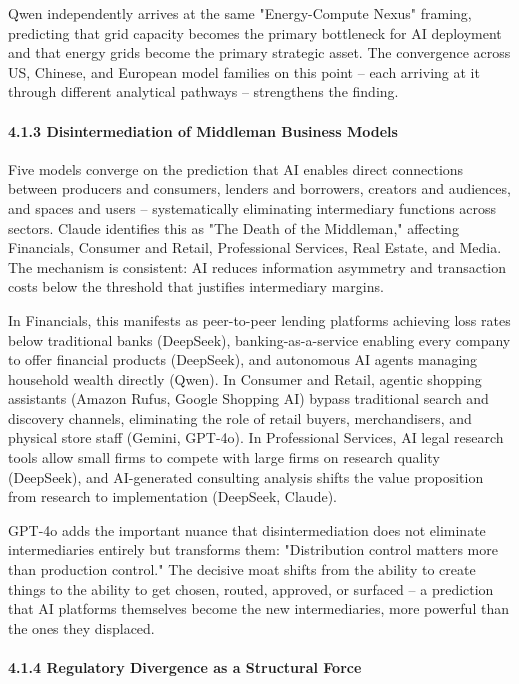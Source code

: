 \documentclass{article}
\begin{document}
Qwen independently arrives at the same "Energy-Compute Nexus" framing, predicting that grid capacity becomes the primary bottleneck for AI deployment and that energy grids become the primary strategic asset. The convergence across US, Chinese, and European model families on this point -- each arriving at it through different analytical pathways -- strengthens the finding.


\paragraph{4.1.3 Disintermediation of Middleman Business Models}

Five models converge on the prediction that AI enables direct connections between producers and consumers, lenders and borrowers, creators and audiences, and spaces and users -- systematically eliminating intermediary functions across sectors. Claude identifies this as "The Death of the Middleman," affecting Financials, Consumer and Retail, Professional Services, Real Estate, and Media. The mechanism is consistent: AI reduces information asymmetry and transaction costs below the threshold that justifies intermediary margins.

In Financials, this manifests as peer-to-peer lending platforms achieving loss rates below traditional banks (DeepSeek), banking-as-a-service enabling every company to offer financial products (DeepSeek), and autonomous AI agents managing household wealth directly (Qwen). In Consumer and Retail, agentic shopping assistants (Amazon Rufus, Google Shopping AI) bypass traditional search and discovery channels, eliminating the role of retail buyers, merchandisers, and physical store staff (Gemini, GPT-4o). In Professional Services, AI legal research tools allow small firms to compete with large firms on research quality (DeepSeek), and AI-generated consulting analysis shifts the value proposition from research to implementation (DeepSeek, Claude).

GPT-4o adds the important nuance that disintermediation does not eliminate intermediaries entirely but transforms them: "Distribution control matters more than production control." The decisive moat shifts from the ability to create things to the ability to get chosen, routed, approved, or surfaced -- a prediction that AI platforms themselves become the new intermediaries, more powerful than the ones they displaced.


\paragraph{4.1.4 Regulatory Divergence as a Structural Force}
\end{document}
